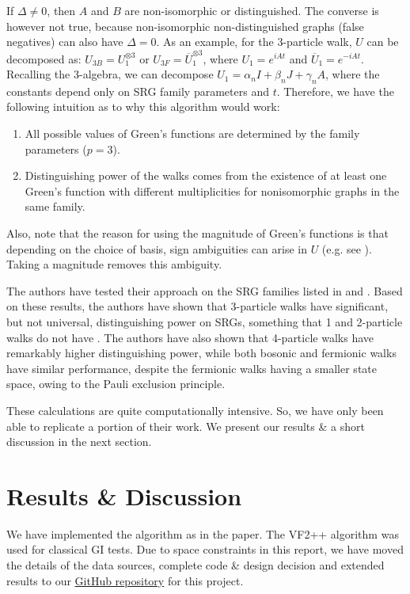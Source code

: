 \documentclass[twocolumn,a4paper,english,10pt]{article}
\begin{document}
If $\Delta \ne 0$, then $A$ and $B$ are non-isomorphic or distinguished. The converse is 
however not true, because non-isomorphic non-distinguished graphs (false negatives) can 
also have $\Delta = 0$. As an example, for the 3-particle walk, $U$ can be decomposed 
as: $U_{3B} = U_1^{\otimes 3}$ or $U_{3F} = \overline{U}_1^{\otimes 3}$, where $U_1 = e^{iAt}$ 
and $\overline{U}_1 = e^{-iAt}$. Recalling the 3-algebra, we can decompose 
$U_1 = \alpha_n I + \beta_n J + \gamma_n A$, where the constants depend only on 
SRG family parameters and $t$. Therefore, we have the following intuition as to why this 
algorithm would work:
\begin{enumerate}
    \item All possible values of Green's functions are determined by the family parameters ($p = 3$).
    \item Distinguishing power of the walks comes from the existence of at least one Green's 
    function with different multiplicities for nonisomorphic graphs in the same family.
\end{enumerate}
Also, note that the reason for using the magnitude of Green's functions is that depending on the choice
of basis, sign ambiguities can arise in $U$ (e.g. see ). Taking a magnitude removes this ambiguity.


The authors have tested their approach on the SRG families listed in  and . 
Based on these results, the authors have shown that 3-particle walks have significant, but not
universal, distinguishing power on SRGs, something that 1 and 2-particle walks do not have \cite{main2}.
The authors have also shown that 4-particle walks have remarkably higher distinguishing power, while both 
bosonic and fermionic walks have similar performance, despite the fermionic walks having a
smaller state space, owing to the Pauli exclusion principle.

These calculations are quite computationally intensive. So, we have only been able to replicate a portion of their work. 
We present our results \& a short discussion in the next section.

\section{Results \& Discussion}
We have implemented the algorithm as in the paper. The VF2++ algorithm was used for classical GI tests.
Due to space constraints in this report, we have moved the details of the data sources, complete code \& design decision and extended results to our \href{https://github.com/JeS24/CTQW-graph-isomorphism}{GitHub repository} 
for this project.
\end{document}
